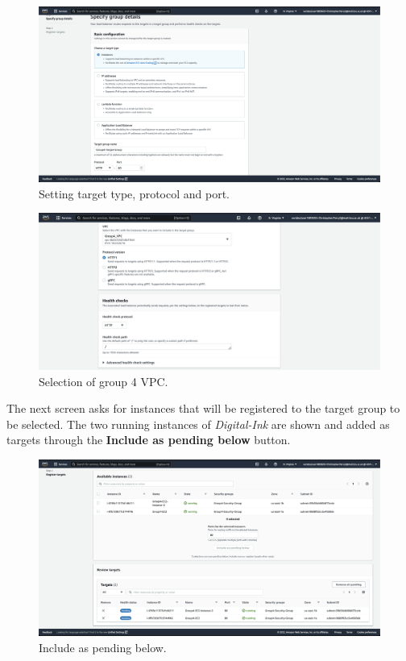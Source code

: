 \begin{figure}[!htbp]
	 \centering
	 \includegraphics[width=\textwidth]{resources/elb/elb-target-group-basic-config}
	 \caption{Setting target type, protocol and port.}
	 \label{fig:elb-target-group-basic-config}
\end{figure}

\begin{figure}[!htbp]
	  \centering
	  \includegraphics[width=\textwidth]{resources/elb/elb-vpc}
	  \caption{Selection of group 4 VPC.}
	  \label{fig:elb-vpc}
\end{figure}

\clearpage
The next screen asks for instances that will be registered to the target group to be selected.
The two running instances of \textit{Digital-Ink} are shown and added as targets through the
\textbf{Include as pending below} button.

\begin{figure}[!htbp]
	  \centering
	  \includegraphics[width=\textwidth]{resources/elb/elb-register-targets}
	  \caption{Include as pending below.}
	  \label{fig:elb-register-targets}
\end{figure}

